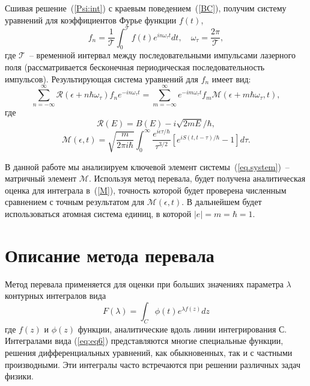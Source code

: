 \documentclass[14pt]{extarticle}
\newcommand{\cR}{\mathcal{R}}
\newcommand{\cM}{\mathcal{M}}
\newcommand{\cT}{\mathcal{T}}
\begin{document}
Сшивая решение~(\ref{Psi:int}) с краевым поведением~(\ref{BC}), получим систему уравнений для коэффициентов Фурье функции $f(t)$, 
\begin{equation}
\label{forier:f}
f_n=\frac{1}{\cT}\int_0^{\cT} f(t) e^{in\omega_\tau t}dt,\quad \omega_\tau = \frac{2\pi}{\cT}, 
\end{equation}
где $\cT$~-- временной интервал между последовательными импульсами лазерного поля (рассматривается бесконечная периодическая последовательность импульсов).
Результирующая система уравнений для $f_n$ имеет вид:
\begin{equation}
\label{eq.system}
\sum_{n=-\infty}^\infty \cR(\epsilon+n\hbar\omega_\tau)f_ne^{-in\omega_\tau t} = \sum_{m=-\infty}^\infty e^{-im\omega_\tau t} f_m \cM(\epsilon+m\hbar\omega_\tau,t),
\end{equation}
где
\begin{equation}
\label{R}
\cR(E) = B(E) - i\sqrt{2mE}/\hbar,
\end{equation}
\begin{equation}
\label{eq:input}
\cM(\epsilon,t) = \sqrt{\frac{m}{2\pi i\hbar}}\int_0^{\infty}
\frac{e^{i\epsilon\tau/\hbar}}{\tau^{3/2}}[e^{iS(t,t-\tau)/\hbar}-1]d\tau.
\end{equation}

В данной работе мы анализируем ключевой элемент системы~(\ref{eq.system})~-- матричный элемент $\cM$. Используя метод перевала, будет получена аналитическая оценка для интеграла в~(\ref{M}), точность которой будет проверена численным сравнением с точным результатом для $\cM(\epsilon,t)$. В дальнейшем будет использоваться атомная система единиц, в которой $|e|=m=\hbar=1$.

\section{Описание метода перевала} 

Метод перевала применяется для оценки при больших значениях параметра $\lambda$ контурных интегралов вида
\begin{equation}\label{eq:eq6}
F(\lambda) = \int_{C}^{}\phi(t)e^{\lambda f(z)}dz
\end{equation} 
где $f(z)$ и $\phi(z)$ функции, аналитические вдоль линии интегрирования С. Интегралами вида (\ref{eq:eq6}) представляются многие специальные функции, решения дифференциальных уравнений, как обыкновенных, так и с частными производными. Эти интегралы часто встречаются при решении различных задач физики.
\end{document}
